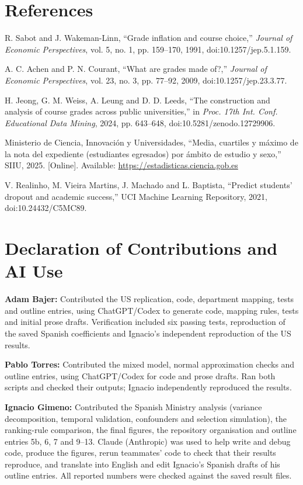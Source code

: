 \documentclass[clean]{bam-outline}
\begin{document}
\section*{References}
\begin{list}{}{\setlength{\leftmargin}{1.8em}\setlength{\itemindent}{-1.8em}\setlength{\itemsep}{0.2em}}
\small
\item[{[1]}] R. Sabot and J. Wakeman-Linn, ``Grade inflation and course choice,'' \textit{Journal of Economic Perspectives}, vol. 5, no. 1, pp. 159--170, 1991, doi:10.1257/jep.5.1.159.
\item[{[2]}] A. C. Achen and P. N. Courant, ``What are grades made of?,'' \textit{Journal of Economic Perspectives}, vol. 23, no. 3, pp. 77--92, 2009, doi:10.1257/jep.23.3.77.
\item[{[3]}] H. Jeong, G. M. Weiss, A. Leung and D. D. Leeds, ``The construction and analysis of course grades across public universities,'' in \textit{Proc. 17th Int. Conf. Educational Data Mining}, 2024, pp. 643--648, doi:10.5281/zenodo.12729906.
\item[{[4]}] Ministerio de Ciencia, Innovaci\'on y Universidades, ``Media, cuartiles y m\'aximo de la nota del expediente (estudiantes egresados) por \'ambito de estudio y sexo,'' SIIU, 2025. [Online]. Available: \url{https://estadisticas.ciencia.gob.es}
\item[{[5]}] V. Realinho, M. Vieira Martins, J. Machado and L. Baptista, ``Predict students' dropout and academic success,'' UCI Machine Learning Repository, 2021, doi:10.24432/C5MC89.
\end{list}

\section*{Declaration of Contributions and AI Use}
\noindent\textbf{Adam Bajer:} Contributed the US replication, code, department mapping, tests and outline entries, using ChatGPT/Codex to generate code, mapping rules, tests and initial prose drafts. Verification included six passing tests, reproduction of the saved Spanish coefficients and Ignacio's independent reproduction of the US results.
\par\noindent\textbf{Pablo Torres:} Contributed the mixed model, normal approximation checks and outline entries, using ChatGPT/Codex for code and prose drafts. Ran both scripts and checked their outputs; Ignacio independently reproduced the results.
\par\noindent\textbf{Ignacio Gimeno:} Contributed the Spanish Ministry analysis (variance decomposition, temporal validation, confounders and selection simulation), the ranking-rule comparison, the final figures, the repository organisation and outline entries 5b, 6, 7 and 9--13. Claude (Anthropic) was used to help write and debug code, produce the figures, rerun teammates' code to check that their results reproduce, and translate into English and edit Ignacio's Spanish drafts of his outline entries. All reported numbers were checked against the saved result files.
\end{document}
